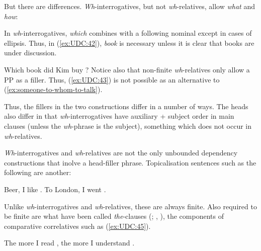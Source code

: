 \documentclass[output=paper
,notxmath 
	        ,collection
	        ,collectionchapter
 	        ,biblatex
                ,babelshorthands
                ,newtxmath
                ,draftmode
                ,colorlinks, citecolor=brown
]{langscibook}
\begin{document}
\noindent
But there are differences. \emph{Wh}-interrogatives, but not
\emph{wh}-relatives, allow \emph{what} and \emph{how}:

\eal
\label{ex:UDC:40}
\zl

\eal
\label{ex:UDC:41}
\zl

\noindent
In \emph{wh}-interrogatives, \emph{which} combines with a following
nominal except in cases of ellipsis. Thus, in (\ref{ex:UDC:42}), \emph{book} is
necessary unless it is clear that books are under discussion.

\ea
\label{ex:UDC:42}
Which book did Kim buy \trace{}?
\z
\noindent
Notice also that non-finite \emph{wh}-relatives only allow a PP as a
filler. Thus, (\ref{ex:UDC:43}) is not possible as an alternative to (\ref{ex:someone-to-whom-to-talk}).

\begin{exe}
     \label{ex:UDC:43}
\end{exe}

\noindent
Thus, the fillers in the two constructions differ in a number of ways.
The heads also differ in that \emph{wh}-interrogatives have auxiliary +
subject order in main clauses (unless the \emph{wh}-phrase is the
subject), something which does not occur in \emph{wh}-relatives.

\emph{Wh}-interrogatives and \emph{wh}-relatives are not the only
unbounded dependency constructions that inolve a head-filler phrase.
Topicalisation sentences such as the following are another:

\begin{exe} \ex \begin{xlist} \label{ex:UDC:44}
\ex Beer, I like \trace{}.
\ex To London, I went \trace{}.
\end{xlist}
\end{exe}

\noindent
Unlike \emph{wh}-interrogatives and \emph{wh}-relatives, these are
always finite. Also required to be finite are what have been called
\emph{the}-clauses (\citealp{Borsley:04}; \citealp[490--494,524--527]{Sag:10a}, \citealp{Borsley:11}), the components of
comparative correlatives such as (\ref{ex:UDC:45}).

\begin{exe}
\ex \label{ex:UDC:45}
The more I read \trace{}, the more I understand \trace{}.
\end{exe}
\end{document}

